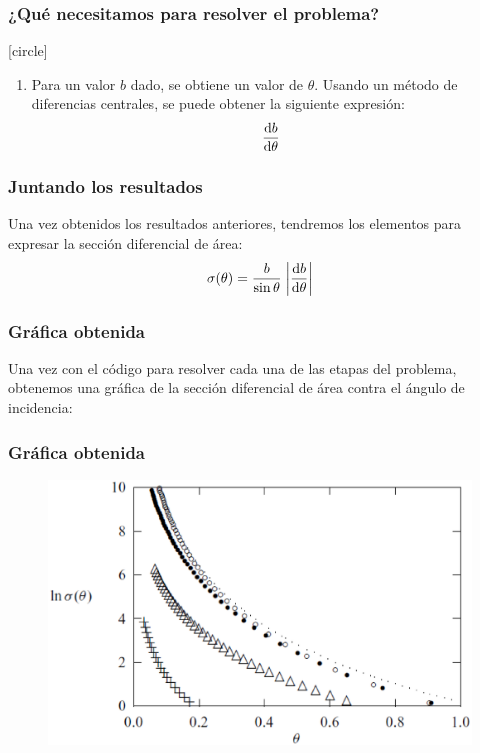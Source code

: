 \begin{frame}
\frametitle{¿Qué necesitamos para resolver el problema?}
[circle]
\begin{enumerate}
\conti
\item Para un valor $b$ dado, se obtiene un valor de $\theta$. Usando un método de diferencias centrales, se puede obtener la siguiente expresión:
\begin{align*}
\dv{b}{\theta}
\end{align*}
\end{enumerate}
\end{frame}
\begin{frame}
\frametitle{Juntando los resultados}
Una vez obtenidos los resultados anteriores, tendremos los elementos para expresar la sección diferencial de área:
\begin{align*}
\sigma(\theta) = \dfrac{b}{\sin \theta} \; \abs{\dv{b}{\theta}}
\end{align*}
\end{frame}
\begin{frame}
\frametitle{Gráfica obtenida}
Una vez con el código para resolver cada una de las etapas del problema, obtenemos una gráfica de la sección diferencial de área contra el ángulo de incidencia:
\end{frame}
\begin{frame}
\frametitle{Gráfica obtenida}
\begin{figure}
\centering
\includegraphics[scale=0.4]{Imagenes/graficadispersion_01.eps} 
\end{figure}
\end{frame}
